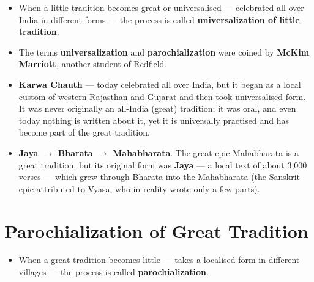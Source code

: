 \begin{itemize}
\item When a little tradition becomes great or universalised --- celebrated all over India in different forms --- the process is called \textbf{universalization of little tradition}.
\item The terms \textbf{universalization} and \textbf{parochialization} were coined by \textbf{McKim Marriott}, another student of Redfield.
\end{itemize}

\begin{ExampleBox}
\begin{itemize}
\item \textbf{Karwa Chauth} --- today celebrated all over India, but it began as a local custom of western Rajasthan and Gujarat and then took universalised form. It was never originally an all-India (great) tradition; it was oral, and even today nothing is written about it, yet it is universally practised and has become part of the great tradition.
\item \textbf{Jaya $\rightarrow$ Bharata $\rightarrow$ Mahabharata}. The great epic Mahabharata is a great tradition, but its original form was \textbf{Jaya} --- a local text of about 3,000 verses --- which grew through Bharata into the Mahabharata (the Sanskrit epic attributed to Vyasa, who in reality wrote only a few parts).
\end{itemize}
\end{ExampleBox}

\section{Parochialization of Great Tradition}

\begin{itemize}
\item When a great tradition becomes little --- takes a localised form in different villages --- the process is called \textbf{parochialization}.
\end{itemize}

